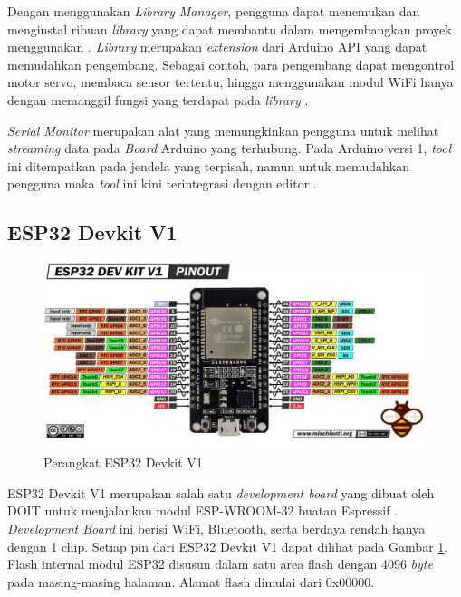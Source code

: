 Dengan menggunakan \emph{Library Manager}, pengguna dapat menemukan dan menginstal ribuan \emph{library} yang dapat membantu dalam mengembangkan proyek menggunakan . \emph{Library} merupakan \emph{extension} dari Arduino API yang dapat memudahkan pengembang. Sebagai contoh, para pengembang dapat mengontrol motor servo, membaca sensor tertentu, hingga menggunakan modul WiFi hanya dengan memanggil fungsi yang terdapat pada \emph{library} \parencite{Söderby_Hylén_2023c}.

\emph{Serial Monitor} merupakan alat yang memungkinkan pengguna untuk melihat \emph{streaming} data pada \emph{Board} Arduino yang terhubung. Pada Arduino versi 1, \emph{tool} ini ditempatkan pada jendela yang terpisah, namun untuk memudahkan pengguna maka \emph{tool} ini kini terintegrasi dengan editor \parencite{Söderby_2023}. 

\subsection{ESP32 Devkit V1}

\begin{figure} [ht] \centering
    \includegraphics[scale=0.39]{gambar/ESP32DevkitV1.jpg}
    \caption{Perangkat ESP32 Devkit V1}
    \label{fig:Perangkat ESP32}
\end{figure}

ESP32 Devkit V1 merupakan salah satu \emph{development board} yang dibuat oleh DOIT untuk menjalankan modul ESP-WROOM-32 buatan Espressif \parencite{SmartArduino_2022}. \emph{Development Board} ini berisi WiFi, Bluetooth, serta berdaya rendah hanya dengan 1 chip. Setiap pin dari ESP32 Devkit V1 dapat dilihat pada Gambar \ref{fig:Perangkat ESP32}. Flash internal modul ESP32 disusun dalam satu area flash dengan 4096 \emph{byte} pada masing-masing halaman. Alamat flash dimulai dari 0x00000.

